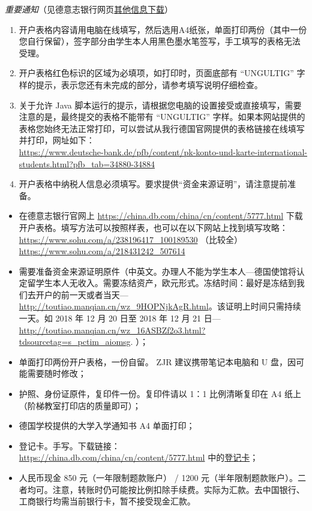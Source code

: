 \documentclass[oneside,final]{book}
\begin{document}
\emph{重要通知}（见德意志银行网页\href{https://china.db.com/china/cn/content/5777.html}{其他信息下载}）
\begin{enumerate}
\item 开户表格内容请用电脑在线填写，然后选用A4纸张，单面打印两份（其中一份您自行保留），签字部分由学生本人用黑色墨水笔签写，手工填写的表格无法受理。
\item 开户表格红色标识的区域为必填项，如打印时，页面底部有 ``UNGULTIG'' 字样的提示，表示您还有未完成的部分，请参考填写说明仔细检查。
\item \sloppy 关于允许 Java 脚本运行的提示，请根据您电脑的设置接受或直接填写，需要注意的是，最终提交的表格不能带有 ``UNGULTIG'' 字样。如果本网站提供的表格您始终无法正常打印，可以尝试从我行德国官网提供的表格链接在线填写并打印，网址如下：\\
\url{https://www.deutsche-bank.de/pfb/content/pk-konto-und-karte-international-students.html?pfb_tab=34880-34884}
\item 开户表格中纳税人信息必须填写。要求提供“资金来源证明”，请注意提前准备。
\end{enumerate}
\begin{itemize}
\item 在德意志银行官网上 \url{https://china.db.com/china/cn/content/5777.html} 下载开户表格。填写方法可以按照样表，也可以在以下网站上找到填写攻略：\\
\url{https://www.sohu.com/a/238196417_100189530} （比较全）\\
\url{https://www.sohu.com/a/218431242_507614}
\item\label{de-bank-ZJR-laptop-USB} 需要准备资金来源证明原件（中英文。办理人不能为学生本人---德国使馆将认定留学生本人无收入。需要冻结资产，欧元形式。冻结时间：最好是冻结到我们去开户的前一天或者当天---\url{http://toutiao.manqian.cn/wz_9HOPNjkAgR.html}。该证明上时间只需持续一天。如 2018 年 12 月 20 日至 2018 年 12 月 21 日---\url{http://toutiao.manqian.cn/wz_16ASBZf2o3.html?tdsourcetag=s_pctim_aiomsg}. ）；
\item 单面打印两份开户表格，一份自留。 ZJR 建议携带笔记本电脑和 U 盘，因可能需要随时修改；
\item 护照、身份证原件，复印件一份。复印件请以 1：1 比例清晰复印在 A4 纸上（阶梯教室打印店的质量即可）；
\item 德国学校提供的大学入学通知书 A4 单面打印；
\item 登记卡。手写。下载链接： \url{https://china.db.com/china/cn/content/5777.html} 中的\href{https://china.db.com/china/docs/Deutsche_Bank-China-Account-Opening-Process-And-Introduction.pdf}{登记卡}；
\item 人民币现金 850 元（一年限制题款账户） / 1200 元（半年限制题款账户）。二者均可。注意，转账时仍可能按比例扣除手续费。实际为汇款。去中国银行、工商银行均需当前银行卡，暂不接受现金汇款。
\end{itemize}
\end{document}
